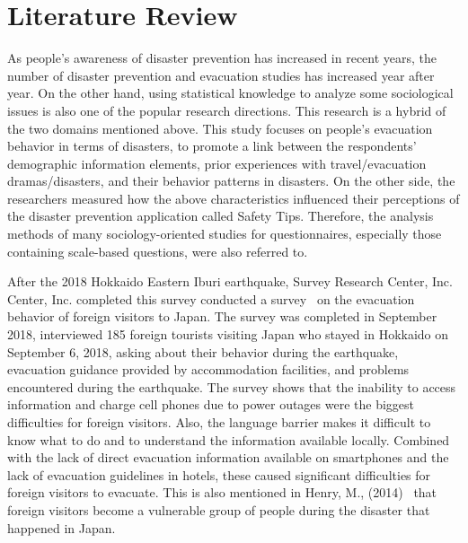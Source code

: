 

\chapter{Literature Review}
\label{c2}

As people's awareness of disaster prevention has increased in recent years, the number of disaster prevention and evacuation studies has increased year after year. On the other hand, using statistical knowledge to analyze some sociological issues is also one of the popular research directions. This research is a hybrid of the two domains mentioned above. This study focuses on people's evacuation behavior in terms of disasters, to promote a link between the respondents' demographic information elements, prior experiences with travel/evacuation dramas/disasters, and their behavior patterns in disasters. On the other side, the researchers measured how the above characteristics influenced their perceptions of the disaster prevention application called Safety Tips. Therefore, the analysis methods of many sociology-oriented studies for questionnaires, especially those containing scale-based questions, were also referred to. 

After the 2018 Hokkaido Eastern Iburi earthquake, Survey Research Center, Inc. Center, Inc. completed this survey conducted a survey~\cite{ref50} on the evacuation behavior of foreign visitors to Japan. The survey was completed in September 2018,  interviewed 185 foreign tourists visiting Japan who stayed in Hokkaido on September 6, 2018, asking about their behavior during the earthquake, evacuation guidance provided by accommodation facilities, and problems encountered during the earthquake. The survey shows that the inability to access information and charge cell phones due to power outages were the biggest difficulties for foreign visitors. Also, the language barrier makes it difficult to know what to do and to understand the information available locally. Combined with the lack of direct evacuation information available on smartphones and the lack of evacuation guidelines in hotels, these caused significant difficulties for foreign visitors to evacuate. This is also mentioned in Henry, M., (2014)~\cite{ref55} that foreign visitors become a vulnerable group of people during the disaster that happened in Japan. 

